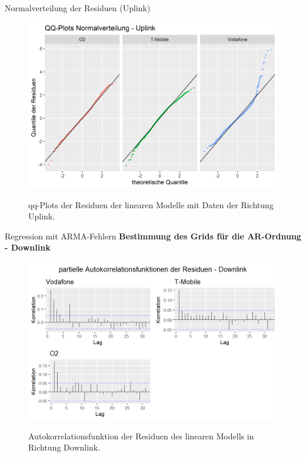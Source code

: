 \documentclass[10pt]{beamer}
\begin{document}
\begin{frame}{Normalverteilung der Residuen (Uplink)}
	\begin{figure}
		\includegraphics[scale=0.35]{plots/arima/uplink/res_qq}\\
		\caption{qq-Plots der Residuen der linearen Modelle mit Daten der Richtung Uplink.}
		\label{res_qq}
	\end{figure}
\end{frame}

\begin{frame}{Regression mit ARMA-Fehlern}
	\textbf{Bestimmung des Grids für die AR-Ordnung - Downlink}
	\begin{figure}
		\includegraphics[scale=0.38]{plots/arima/downlink/res_pacf}\\
		\caption{Autokorrelationsfunktion der Residuen des linearen Modells in Richtung Downlink.}
		\label{res_pacf_dl}
	\end{figure}	
\end{frame}
\end{document}
